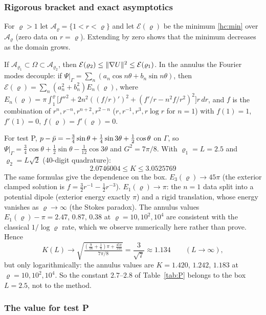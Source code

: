 \subsubsection{Rigorous bracket and exact asymptotics}

For $\varrho>1$ let $\mathcal A_\varrho=\{1<r<\varrho\}$ and let $\mathcal E(\varrho)$ be the minimum \eqref{hc:min} over $\mathcal A_\varrho$ (zero data on
$r=\varrho$). Extending by zero shows that the minimum decreases as the domain grows.

\begin{proposition}\label{hc:bracket}
If $\mathcal A_{\varrho_1}\subset\Omega\subset\mathcal A_{\varrho_2}$, then $\mathcal E(\varrho_2)\le\lVert \nabla U\rVert^2\le\mathcal E(\varrho_1)$. In the annulus the
Fourier modes decouple: if $\Psi|_\Gamma=\sum_n(a_n\cos n\theta+b_n\sin n\theta)$, then $\mathcal E(\varrho)=\sum_n(a_n^2+b_n^2)E_n(\varrho)$, where
$E_n(\varrho)=\pi\int_1^\varrho\bigl[f''^2+2n^2((f/r)')^2+(f'/r-n^2f/r^2)^2\bigr]r\,dr$, and $f$ is the combination of
$r^n,r^{-n},r^{n+2},r^{2-n}$ ($r,r^{-1},r^3,r\log r$ for $n=1$) with $f(1)=1$, $f'(1)=0$, $f(\varrho)=f'(\varrho)=0$.
\end{proposition}

For test P, $p-\bar p=-\frac34\sin\theta+\frac14\sin3\theta+\frac12\cos\theta$ on $\Gamma$, so
$\Psi|_\Gamma=\frac34\cos\theta+\frac12\sin\theta-\frac1{12}\cos3\theta$ and $G^2=7\pi/8$. With $\varrho_1=L=2.5$ and $\varrho_2=L\sqrt2$
(40-digit quadrature):
\[
\boxed{\,2.0746004\le K\le3.0525769\,}
\]
The same formulas give the dependence on the box. $E_3(\varrho)\to45\pi$ (the exterior clamped solution is
$f=\frac32r^{-1}-\frac12r^{-3}$). $E_1(\varrho)\to\pi$: the $n=1$ data split into a potential dipole (exterior energy exactly $\pi$) and
a rigid translation, whose energy vanishes as $\varrho\to\infty$ (the Stokes paradox). The annulus values $E_1(\varrho)-\pi=2.47$, $0.87$, $0.38$ at $\varrho=10,10^2,10^4$ are consistent with the classical $1/\log\varrho$ rate, which we observe numerically here rather than prove. Hence
\[
K(L)\longrightarrow\sqrt{\tfrac{(\frac9{16}+\frac14)\pi+\frac{45\pi}{144}}{7\pi/8}}=\frac3{\sqrt7}\approx1.134\qquad(L\to\infty),
\]
but only logarithmically: the annulus values are $K=1.420$, $1.242$, $1.183$ at $\varrho=10,10^2,10^4$. So the constant
$2.7$--$2.8$ of Table~\ref{tab:P} belongs to the box $L=2.5$, not to the method.

\subsubsection{The value for test P}

